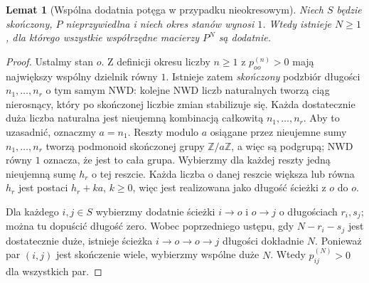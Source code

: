 \documentclass[11pt,a4paper,oneside]{report}
\numberwithin{equation}{chapter}
\theoremstyle{plain}
\newtheorem{lemat}[twierdzenie]{Lemat}
\theoremstyle{definition}
\theoremstyle{remark}
\newcommand{\Z}{\mathbb{Z}}
\begin{document}
\begin{lemat}[Wspólna dodatnia potęga w przypadku nieokresowym]
Niech $S$ będzie skończony, $P$ nieprzywiedlna
i niech okres stanów wynosi $1$. Wtedy istnieje
$N\geq1$, dla którego wszystkie współrzędne
macierzy $P^N$ są dodatnie.
\end{lemat}
\begin{proof}
Ustalmy stan $o$. Z definicji okresu liczby
$n\geq1$ z $p_{oo}^{(n)}>0$ mają największy
wspólny dzielnik równy $1$. Istnieje zatem
\emph{skończony} podzbiór długości
$n_1,\ldots,n_r$ o tym samym NWD: kolejne NWD
liczb naturalnych tworzą ciąg nierosnący,
który po skończonej liczbie zmian stabilizuje się.
Każda dostatecznie duża liczba naturalna jest
nieujemną kombinacją całkowitą $n_1,\ldots,n_r$.
Aby to uzasadnić, oznaczmy $a=n_1$.
Reszty modulo $a$ osiągane przez nieujemne sumy
$n_1,\ldots,n_r$ tworzą podmonoid skończonej
grupy $\Z/a\Z$, a więc są podgrupą;
NWD równy $1$ oznacza, że jest to cała grupa.
Wybierzmy dla każdej reszty jedną nieujemną sumę
$h_r$ o tej reszcie. Każda liczba o danej reszcie
większa lub równa $h_r$ jest postaci $h_r+ka$,
$k\geq0$, więc jest realizowana jako długość
ścieżki z $o$ do $o$.

Dla każdego $i,j\in S$ wybierzmy dodatnie
ścieżki $i\to o$ i $o\to j$ o długościach
$r_i,s_j$; można tu dopuścić długość zero.
Wobec poprzedniego ustępu, gdy $N-r_i-s_j$
jest dostatecznie duże, istnieje ścieżka
$i\to o\to o\to j$ długości dokładnie $N$.
Ponieważ par $(i,j)$ jest skończenie wiele,
wybierzmy wspólne duże $N$. Wtedy
$p_{ij}^{(N)}>0$ dla wszystkich par.
\end{proof}
\end{document}
